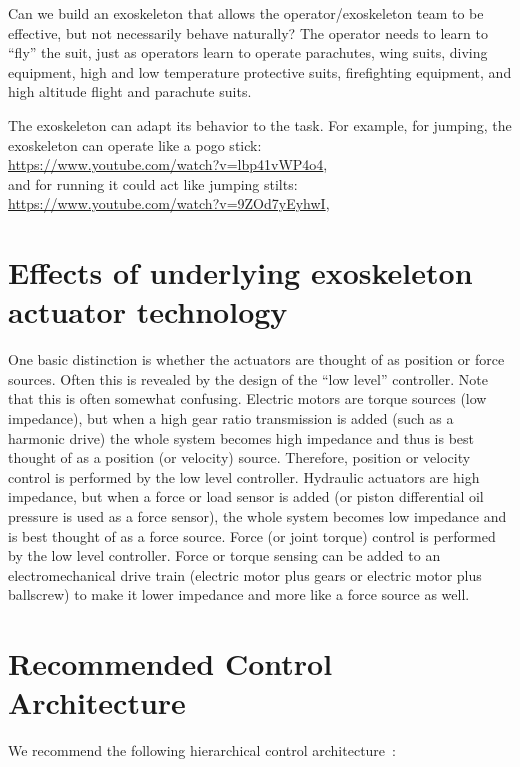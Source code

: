 \documentclass[letterpaper,12pt,fullpage]{article}
\begin{document}
Can we build an exoskeleton that allows the operator/exoskeleton team
to be effective, but not necessarily behave naturally? 
The operator needs to learn to ``fly'' the suit,
just as operators learn to operate parachutes,
wing suits, diving equipment, high and low temperature protective
suits, firefighting equipment, and high altitude flight
and parachute suits.

The exoskeleton can adapt its behavior to the task.
For example, for jumping, the exoskeleton can operate like a pogo 
stick:\\
\url{https://www.youtube.com/watch?v=lbp41vWP4o4},\\ 
and for running it could act like jumping stilts:\\
\url{https://www.youtube.com/watch?v=9ZOd7yEyhwI},

\section{Effects of underlying exoskeleton actuator technology}

One basic distinction is whether the actuators are thought of as position
or force sources. Often this is revealed by the design of the ``low level''
controller. Note that this is often somewhat confusing. Electric motors
are torque sources (low impedance), but when a high gear ratio transmission
is added (such as a harmonic drive) the whole system becomes high impedance
and thus is best thought of as a position (or velocity) source. Therefore,
position or velocity 
control is performed by the low level controller. Hydraulic actuators
are high impedance, but when a force or load sensor is added (or piston differential
oil pressure is used as a force sensor), the whole system becomes low impedance
and is best thought of as a force source. Force (or joint torque) control is
performed by the low level controller. Force or torque sensing can be added to an
electromechanical drive train (electric motor plus gears or electric
motor plus ballscrew)
to make it lower impedance and more like a force source as well.

\section{Recommended Control Architecture}
\label{sec:architecture}

We recommend the following hierarchical control architecture~\cite{IEEE06907051}:
\end{document}
